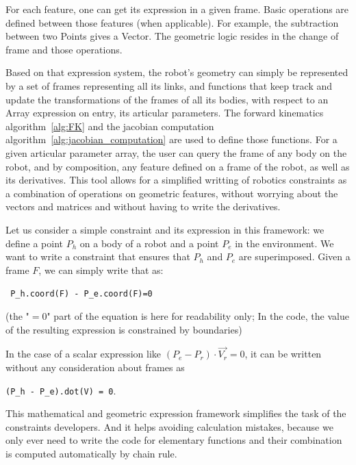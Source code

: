 For each feature, one can get its expression in a given frame.
Basic operations are defined between those features (when applicable).
For example, the subtraction between two Points gives a Vector.
The geometric logic resides in the change of frame and those operations.

Based on that expression system, the robot's geometry can simply be represented by a set of frames representing all its links, and functions that keep track and update the transformations of the frames of all its bodies, with respect to an Array expression on entry, its articular parameters.
The forward kinematics algorithm~\ref{alg:FK} and the jacobian computation algorithm~\ref{alg:jacobian_computation} are used to define those functions.
For a given articular parameter array, the user can query the frame of any body on the robot, and by composition, any feature defined on a frame of the robot, as well as its derivatives.
This tool allows for a simplified writting of robotics constraints as a combination of operations on geometric features, without worrying about the vectors and matrices and without having to write the derivatives.

Let us consider a simple constraint and its expression in this framework:
we define a point $P_h$ on a body of a robot and a point $P_e$ in the environment.
We want to write a constraint that ensures that $P_h$ and $P_e$ are superimposed.
Given a frame $F$, we can simply write that as:
\begin{center}
\tt{ P\_h.coord(F) - P\_e.coord(F)=0}
\end{center}
(the "$=0$" part of the equation is here for readability only; In the code, the value of the resulting expression is constrained by boundaries)

In the case of a scalar expression like $(P_e - P_r)\cdot \overrightarrow{V_r} = 0$, it can be written without any consideration about frames as
\begin{center}
{\tt(P\_h - P\_e).dot(V) = 0}.
\end{center}

This mathematical and geometric expression framework simplifies the task of the constraints developers.
And it helps avoiding calculation mistakes, because we only ever need to write the code for elementary functions and their combination is computed automatically by chain rule.


